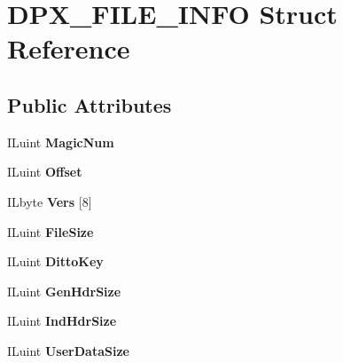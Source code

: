 \hypertarget{structDPX__FILE__INFO}{}\section{D\+P\+X\+\_\+\+F\+I\+L\+E\+\_\+\+I\+N\+FO Struct Reference}
\label{structDPX__FILE__INFO}
\subsection*{Public Attributes}
\begin{DoxyCompactItemize}
\item 
\mbox{\label{structDPX__FILE__INFO_aff68409189ea4ac2e29a4efacf4c7d5d}} 
I\+Luint {\bfseries Magic\+Num}
\item 
\mbox{\label{structDPX__FILE__INFO_ae7b5787b32a8e2e9b773892f20886316}} 
I\+Luint {\bfseries Offset}
\item 
\mbox{\label{structDPX__FILE__INFO_a77faed3fb4dd0bcf0db4e813142cdcc0}} 
I\+Lbyte {\bfseries Vers} \mbox{[}8\mbox{]}
\item 
\mbox{\label{structDPX__FILE__INFO_aa19e8111b71c465f16c931c130f9ec70}} 
I\+Luint {\bfseries File\+Size}
\item 
\mbox{\label{structDPX__FILE__INFO_a11a80cadd5b09edab5692556243de258}} 
I\+Luint {\bfseries Ditto\+Key}
\item 
\mbox{\label{structDPX__FILE__INFO_a0e632d6ab414f9433778dbbffa2e6db1}} 
I\+Luint {\bfseries Gen\+Hdr\+Size}
\item 
\mbox{\label{structDPX__FILE__INFO_ad911b159a06d4a4cf5317233907dac73}} 
I\+Luint {\bfseries Ind\+Hdr\+Size}
\item 
\mbox{\label{structDPX__FILE__INFO_ad92267e383106baaba9397fb1effe1e2}} 
I\+Luint {\bfseries User\+Data\+Size}
\item 
\mbox{\label{structDPX__FILE__INFO_aa20fb49297993f3669820460880a1b8a}} 

\end{DoxyCompactItemize}
